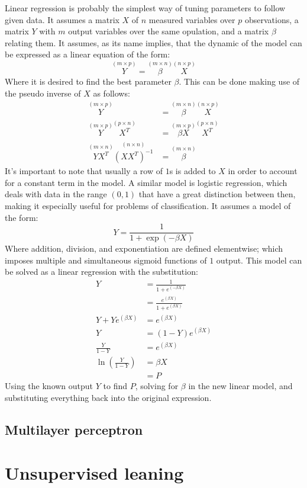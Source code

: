 \documentclass[journal]{IEEEtran}
\begin{document}
Linear regression is probably the simplest way of tuning parameters to follow
given data. It assumes a matrix $X$ of $n$ measured variables over $p$
observations, a matrix $Y$ with $m$ output variables over the same opulation,
and a matrix $\beta$ relating them. It assumes, as its name implies, that the
dynamic of the model can be expressed as a linear equation of the form: 
%
\begin{equation}\label{eq:linear}
    \overset{(m\times p)}{Y}
    = \overset{(m\times n)}{\beta} \overset{(n\times p)}{X}
\end{equation}
%
Where it is desired to find the best parameter $\beta$. This can be done making
use of the pseudo inverse of $X$ as follows:
%
\begin{align*}
    \overset{(m\times p)}{Y}
        &= \overset{(m\times n)}{\beta} \overset{(n\times p)}{X}\\
    \overset{(m\times p)}{Y}\overset{(p\times n)}{X^T}
        &= \overset{(m\times p)}{\beta X} \overset{(p\times n)}{X^T}\nonumber\\
    \overset{(m\times n)}{Y X^T} \overset{(n\times n)}{\left(X X^T\right)^{-1}}
        &= \overset{(m\times n)}{\beta}
\end{align*}
%
It's important to note that usually a row of $1$s is added to $X$ in order to
account for a constant term in the model. A similar model is logistic
regression, which deals with data in the range $(0, 1)$ that have a great
distinction between then, making it especially useful for problems of
classification. It assumes a model of the form:
%
\begin{equation}
    Y = \frac{1}{1+\exp{(-\beta X)}}
\end{equation}
%
Where addition, division, and exponentiation are defined elementwise; which
imposes multiple and simultaneous sigmoid functions of $1$ output. 
This model can be solved as a linear regression with the substitution:
%
\begin{align*}
    Y &= \frac{1}{1+e^{(-\beta X)}}\nonumber\\
        &= \frac{e^{(\beta X)}}{1+e^{(\beta X)}}\\
    Y+Ye^{(\beta X)}
        &= e^{(\beta X)}\\
    Y &= (1-Y) e^{(\beta X)}\\
    \frac{Y}{1-Y} &= e^{(\beta X)}\\
    \ln{\left(\frac{Y}{1-Y}\right)} &= \beta X\\
        &= P
\end{align*}
%
Using the known output $Y$ to find $P$, solving for $\beta$ in the new linear
model, and substituting everything back into the original expression.



\subsection{Multilayer perceptron\label{sec:nn}}

\section{Unsupervised leaning\label{sec:unsupervised}}
\printbibliography
\end{document}
